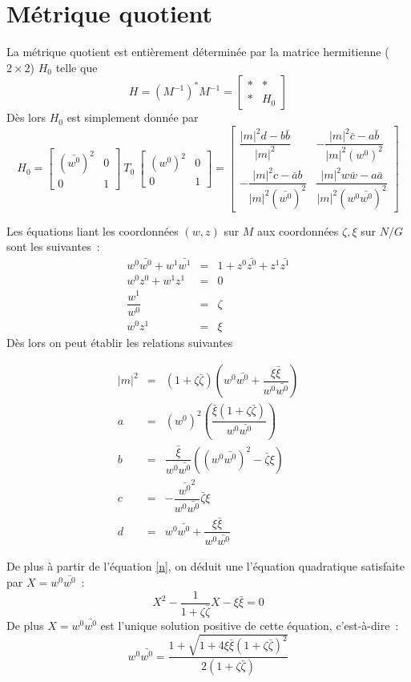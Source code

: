 \documentclass[a4paper,10pt]{article}
\begin{document}
\section{Métrique quotient}
La métrique quotient est entièrement déterminée par la matrice hermitienne ($2\times 2$) $H_0$ telle que 
\[
H =  (M^{-1})^*M^{-1} =
\begin{bmatrix}
* & * \\ 
* & H_0
\end{bmatrix}
\]
Dès lors $H_0$ est simplement donnée par
\[
H_0 = 
\begin{bmatrix}
(\bar{w^0})^2 & 0 \\ 
0 & 1
\end{bmatrix} \ T_0 \ 
\begin{bmatrix}
(w^0)^2 & 0 \\ 
0 & 1
\end{bmatrix}
=
\begin{bmatrix}
\dfrac{|m|^2d-b\bar{b}}{|m|^2} & -\dfrac{|m|^2\bar{c}-a\bar{b}}{|m|^2(w^0)^2} \\ 
-\dfrac{|m|^2c-\bar{a}b}{|m|^2(\bar{w^0})^2} & \dfrac{|m|^2w\bar{w}-a\bar{a}}{|m|^2(w^0\bar{w^0})^2}
\end{bmatrix} 
\]

Les équations liant les coordonnées $(w,z)$ sur $M$ aux coordonnées $\zeta, \xi$ sur $N/G$ sont les suivantes~:
\begin{eqnarray}
w^0 \bar{w^0} + w^1 \bar{w^1} &=& 1 + z^0 \bar{z^0} + z^1 \bar{z^1} \label{n}\\
w^0 z^0 + w^1z^1 &=& 0\\
\dfrac{w^1}{w^0} &=& \zeta\\
w^0z^1 &=& \xi
\end{eqnarray}
Dès lors on peut établir les relations suivantes

\begin{eqnarray*}
|m|^2 & = & (1+\zeta\bar{\zeta})\left(  w^0\bar{w^0} + \dfrac{\xi\bar{\xi}}{w^0\bar{w^0}} \right)\\
a & = & (w^0)^2\left( \dfrac{\bar{\xi}(1+\zeta\bar{\zeta})}{w^0\bar{w^0}} \right) \\
b & = & \dfrac{\bar{\xi}}{w^0\bar{w^0}}\left( (w^0\bar{w^0})^2 - \bar{\zeta}\xi \right) \\
c & = & -\dfrac{\bar{w^0}^2}{w^0\bar{w^0}}\bar{\zeta}\xi \\
d & = & w^0\bar{w^0} + \dfrac{\xi\bar{\xi}}{w^0\bar{w^0}}
\end{eqnarray*}

De plus à partir de l'équation \eqref{n}, on déduit une l'équation quadratique satisfaite par $X = w^0\bar{w^0}$~:
\[
X^2 - \dfrac{1}{1+\zeta\bar{\zeta}} X - \xi \bar{\xi} = 0
\]
De plus $X = w^0\bar{w^0}$ est l'unique solution positive de cette équation, c'est-à-dire~:
\[
w^0\bar{w^0} = \dfrac{1+\sqrt{1+4\xi\bar{\xi}(1+\zeta\bar{\zeta})^2}}{2(1+\zeta\bar{\zeta})}
\]
\end{document}
